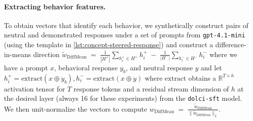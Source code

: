 \documentclass{article} %
\begin{document}
\paragraph{Extracting behavior features.}

\label{apdx:extract-dom-feature-traits}


To obtain vectors that identify each behavior, we synthetically construct pairs of neutral and demonstrated responses under a set of prompts from \texttt{gpt-4.1-mini} (using the template in \ref{lst:concept-steered-response}) and construct a difference-in-means direction $\tilde{w}_{\text{DiffMean}} \;=\; \frac{1}{|H^+|}\sum_{h_i^+ \in H^+} h_i^+ \;-\; \frac{1}{|H^-|}\sum_{h_i^- \in H^-} h_i^-$
where we have a prompt $x$, behavioral response $y_b$, and neutral response $y$ and let $h_i^+=\mathrm{extract}(x\oplus y_b), h_i^-=\mathrm{extract}(x\oplus y)$ where $\mathrm{extract}$ obtains a $\mathbb R^{T\times h}$ activation tensor for $T$ response tokens and a residual stream dimension of $h$ at the desired layer (always 16 for these experiments) from the \texttt{dolci-sft} model. We then unit-normalize the vectors to compute $w_{\text{DiffMean}} \;=\; \frac{\tilde{w}_{\text{DiffMean}}}{\lVert \tilde{w}_{\text{DiffMean}} \rVert_2}$.

\begin{table}[h]
\centering
\small
{}
\caption{Concept detection and steering results from 200 held-out prompts from AlpacaEval.}
\label{table:dom-metrics}
\end{table}
\end{document}
